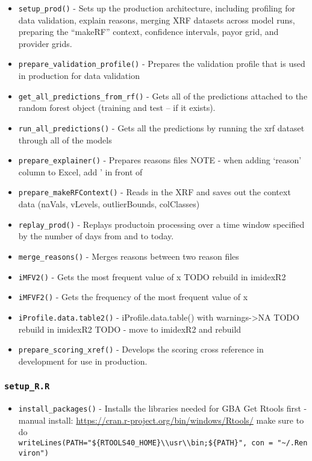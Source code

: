 \documentclass[
]{book}
\providecommand{\tightlist}{%
  \setlength{\itemsep}{0pt}\setlength{\parskip}{0pt}}
\begin{document}
\begin{itemize}
\tightlist
\item
  \texttt{setup\_prod()} - Sets up the production architecture, including profiling for data validation, explain reasons, merging XRF datasets across model runs, preparing the ``makeRF'' context, confidence intervals, payor grid, and provider grids.
\item
  \texttt{prepare\_validation\_profile()} - Prepares the validation profile that is used in production for data validation
\item
  \texttt{get\_all\_predictions\_from\_rf()} - Gets all of the predictions attached to the random forest object (training and test -- if it exists).
\item
  \texttt{run\_all\_predictions()} - Gets all the predictions by running the xrf dataset through all of the models
\item
  \texttt{prepare\_explainer()} - Prepares reasons files NOTE - when adding `reason' column to Excel, add ' in front of
\item
  \texttt{prepare\_makeRFContext()} - Reads in the XRF and saves out the context data (naVals, vLevels, outlierBounds, colClasses)
\item
  \texttt{replay\_prod()} - Replays productoin processing over a time window specified by the number of days from and to today.
\item
  \texttt{merge\_reasons()} - Merges reasons between two reason files
\item
  \texttt{iMFV2()} - Gets the most frequent value of x TODO rebuild in imidexR2
\item
  \texttt{iMFVF2()} - Gets the frequency of the most frequent value of x
\item
  \texttt{iProfile.data.table2()} - iProfile.data.table() with warnings-\textgreater NA TODO rebuild in imidexR2 TODO - move to imidexR2 and rebuild
\item
  \texttt{prepare\_scoring\_xref()} - Develops the scoring cross reference in development for use in production.
\end{itemize}

\hypertarget{setup_r.r}{%
\subsubsection{\texorpdfstring{\texttt{setup\_R.R}}{setup\_R.R}}\label{setup_r.r}}

\begin{itemize}
\tightlist
\item
  \texttt{install\_packages()} - Installs the libraries needed for GBA Get Rtools first - manual install: \url{https://cran.r-project.org/bin/windows/Rtools/} make sure to do \texttt{writeLines(\textquotesingle{}PATH="\$\{RTOOLS40\_HOME\}\textbackslash{}\textbackslash{}usr\textbackslash{}\textbackslash{}bin;\$\{PATH\}"\textquotesingle{},\ con\ =\ "\textasciitilde{}/.Renviron")}
\end{itemize}
\end{document}
